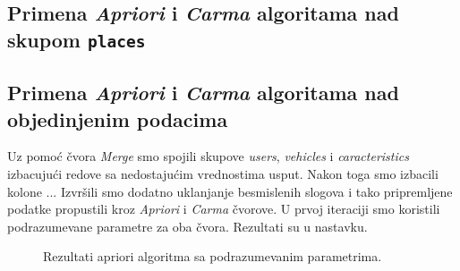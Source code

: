 \documentclass[a4paper,10pt]{article}
\begin{document}
% 	

\subsection{Primena \textit{Apriori} i \textit{Carma} algoritama nad skupom \texttt{places}}

\subsection{Primena \textit{Apriori} i \textit{Carma} algoritama nad objedinjenim podacima}

Uz pomoć čvora \textit{Merge} smo spojili skupove \textit{users}, \textit{vehicles} i \textit{caracteristics} izbacujući 
redove sa nedostajućim vrednostima usput. Nakon toga smo izbacili kolone ... Izvršili smo dodatno uklanjanje besmislenih slogova
i tako pripremljene podatke propustili kroz \textit{Apriori} i \textit{Carma} čvorove. U prvoj iteraciji smo koristili
podrazumevane parametre za oba čvora. Rezultati su u nastavku.

\begin{figure}[h!]
 \centering
 \caption{Rezultati apriori algoritma sa podrazumevanim parametrima.}
\end{figure}
\end{document}
